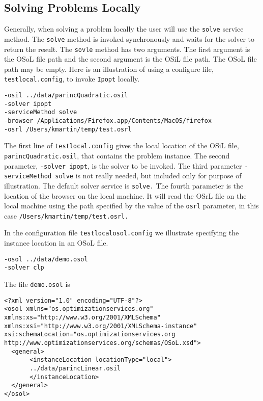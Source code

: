 \documentclass[12pt]{article}
\renewcommand{\_}{{\char"5F}}
\renewcommand{\{}{{\char"7B}}
\renewcommand{\}}{{\char"7D}}
\renewcommand{\^}{{\char"0D}}
\renewcommand{\'}{{\char"0D}}
\begin{document}
\subsection{Solving Problems Locally}

Generally, when solving a problem locally the user will use the {\tt solve} service method. The {\tt solve} method is invoked synchronously and waits for the solver to return the result. The {\tt sovle} method has two arguments. The first argument is the OSoL file path and the second argument is the OSiL file path. The OSoL file path may be empty.  Here is an illustration of using a configure file,  {\tt testlocal.config}, to invoke {\tt Ipopt} locally.

\begin{verbatim}
-osil ../data/parincQuadratic.osil
-solver ipopt
-serviceMethod solve
-browser /Applications/Firefox.app/Contents/MacOS/firefox
-osrl /Users/kmartin/temp/test.osrl
\end{verbatim}

The first line of {\tt testlocal.config} gives the local location of the OSiL file, {\tt parincQuadratic.osil}, that contains the problem instance. The second parameter, {\tt -solver ipopt},  is the solver to be invoked. The third parameter {\tt -serviceMethod solve} is not really needed, but included only for purpose of illustration. The default  solver service is {\tt solve.}  The fourth parameter is the location of the browser on the local machine. It will read the OSrL file on the local machine using the path specified by the value of the {\tt osrl} parameter, in this case {\tt /Users/kmartin/temp/test.osrl.}

In the configuration file {\tt testlocalosol.config} we illustrate specifying the instance location in an OSoL file.

\begin{verbatim}
-osol ../data/demo.osol
-solver clp
\end{verbatim}

The file {\tt demo.osol} is

\begin{verbatim}
<?xml version="1.0" encoding="UTF-8"?>
<osol xmlns="os.optimizationservices.org"
xmlns:xs="http://www.w3.org/2001/XMLSchema"
xmlns:xsi="http://www.w3.org/2001/XMLSchema-instance"
xsi:schemaLocation="os.optimizationservices.org 
http://www.optimizationservices.org/schemas/OSoL.xsd">
  <general>         
       <instanceLocation locationType="local">
       ../data/parincLinear.osil
       </instanceLocation>
  </general>
</osol>
\end{verbatim}
\end{document}
